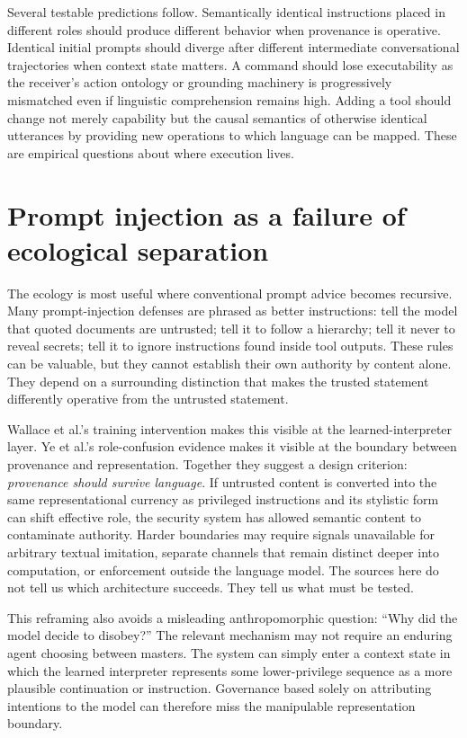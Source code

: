 \documentclass[11pt]{article}
\begin{document}
Several testable predictions follow. Semantically identical instructions placed in different roles should produce different behavior when provenance is operative. Identical initial prompts should diverge after different intermediate conversational trajectories when context state matters. A command should lose executability as the receiver's action ontology or grounding machinery is progressively mismatched even if linguistic comprehension remains high. Adding a tool should change not merely capability but the causal semantics of otherwise identical utterances by providing new operations to which language can be mapped. These are empirical questions about where execution lives.

\section{Prompt injection as a failure of ecological separation}

The ecology is most useful where conventional prompt advice becomes recursive. Many prompt-injection defenses are phrased as better instructions: tell the model that quoted documents are untrusted; tell it to follow a hierarchy; tell it never to reveal secrets; tell it to ignore instructions found inside tool outputs. These rules can be valuable, but they cannot establish their own authority by content alone. They depend on a surrounding distinction that makes the trusted statement differently operative from the untrusted statement.

Wallace et al.'s training intervention makes this visible at the learned-interpreter layer. Ye et al.'s role-confusion evidence makes it visible at the boundary between provenance and representation. Together they suggest a design criterion: \emph{provenance should survive language}. If untrusted content is converted into the same representational currency as privileged instructions and its stylistic form can shift effective role, the security system has allowed semantic content to contaminate authority. Harder boundaries may require signals unavailable for arbitrary textual imitation, separate channels that remain distinct deeper into computation, or enforcement outside the language model. The sources here do not tell us which architecture succeeds. They tell us what must be tested.

This reframing also avoids a misleading anthropomorphic question: ``Why did the model decide to disobey?'' The relevant mechanism may not require an enduring agent choosing between masters. The system can simply enter a context state in which the learned interpreter represents some lower-privilege sequence as a more plausible continuation or instruction. Governance based solely on attributing intentions to the model can therefore miss the manipulable representation boundary.
\end{document}

